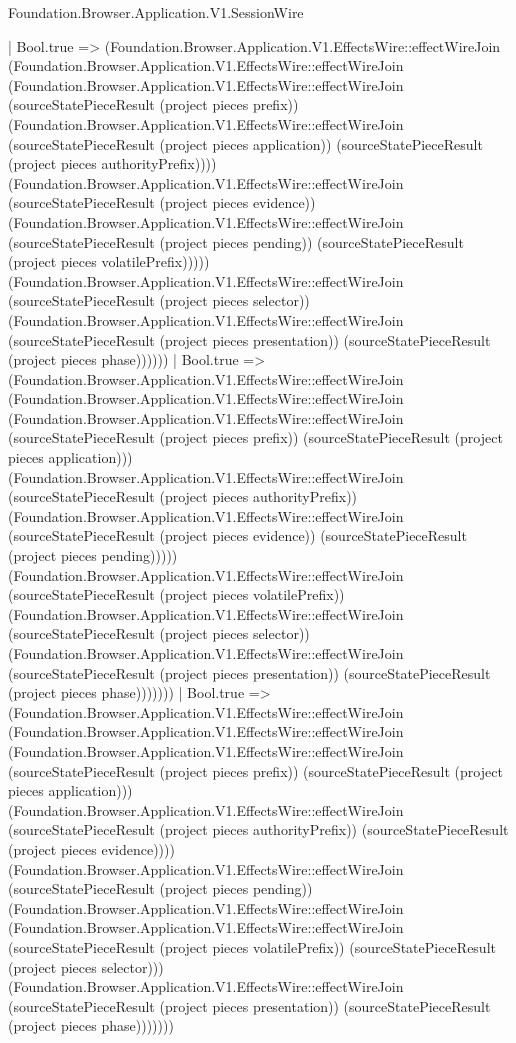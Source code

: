 \begin{lexlean}{Foundation.Browser.Application.V1.SessionWire}
\begin{semanticmodule}
{                | Bool.true => (Foundation.Browser.Application.V1.EffectsWire::effectWireJoin (Foundation.Browser.Application.V1.EffectsWire::effectWireJoin (Foundation.Browser.Application.V1.EffectsWire::effectWireJoin (sourceStatePieceResult (project pieces prefix)) (Foundation.Browser.Application.V1.EffectsWire::effectWireJoin (sourceStatePieceResult (project pieces application)) (sourceStatePieceResult (project pieces authorityPrefix)))) (Foundation.Browser.Application.V1.EffectsWire::effectWireJoin (sourceStatePieceResult (project pieces evidence)) (Foundation.Browser.Application.V1.EffectsWire::effectWireJoin (sourceStatePieceResult (project pieces pending)) (sourceStatePieceResult (project pieces volatilePrefix))))) (Foundation.Browser.Application.V1.EffectsWire::effectWireJoin (sourceStatePieceResult (project pieces selector)) (Foundation.Browser.Application.V1.EffectsWire::effectWireJoin (sourceStatePieceResult (project pieces presentation)) (sourceStatePieceResult (project pieces phase))))))
              | Bool.true => (Foundation.Browser.Application.V1.EffectsWire::effectWireJoin (Foundation.Browser.Application.V1.EffectsWire::effectWireJoin (Foundation.Browser.Application.V1.EffectsWire::effectWireJoin (sourceStatePieceResult (project pieces prefix)) (sourceStatePieceResult (project pieces application))) (Foundation.Browser.Application.V1.EffectsWire::effectWireJoin (sourceStatePieceResult (project pieces authorityPrefix)) (Foundation.Browser.Application.V1.EffectsWire::effectWireJoin (sourceStatePieceResult (project pieces evidence)) (sourceStatePieceResult (project pieces pending))))) (Foundation.Browser.Application.V1.EffectsWire::effectWireJoin (sourceStatePieceResult (project pieces volatilePrefix)) (Foundation.Browser.Application.V1.EffectsWire::effectWireJoin (sourceStatePieceResult (project pieces selector)) (Foundation.Browser.Application.V1.EffectsWire::effectWireJoin (sourceStatePieceResult (project pieces presentation)) (sourceStatePieceResult (project pieces phase)))))))
            | Bool.true => (Foundation.Browser.Application.V1.EffectsWire::effectWireJoin (Foundation.Browser.Application.V1.EffectsWire::effectWireJoin (Foundation.Browser.Application.V1.EffectsWire::effectWireJoin (sourceStatePieceResult (project pieces prefix)) (sourceStatePieceResult (project pieces application))) (Foundation.Browser.Application.V1.EffectsWire::effectWireJoin (sourceStatePieceResult (project pieces authorityPrefix)) (sourceStatePieceResult (project pieces evidence)))) (Foundation.Browser.Application.V1.EffectsWire::effectWireJoin (sourceStatePieceResult (project pieces pending)) (Foundation.Browser.Application.V1.EffectsWire::effectWireJoin (Foundation.Browser.Application.V1.EffectsWire::effectWireJoin (sourceStatePieceResult (project pieces volatilePrefix)) (sourceStatePieceResult (project pieces selector))) (Foundation.Browser.Application.V1.EffectsWire::effectWireJoin (sourceStatePieceResult (project pieces presentation)) (sourceStatePieceResult (project pieces phase)))))))
}
\end{semanticmodule}
\end{lexlean}
